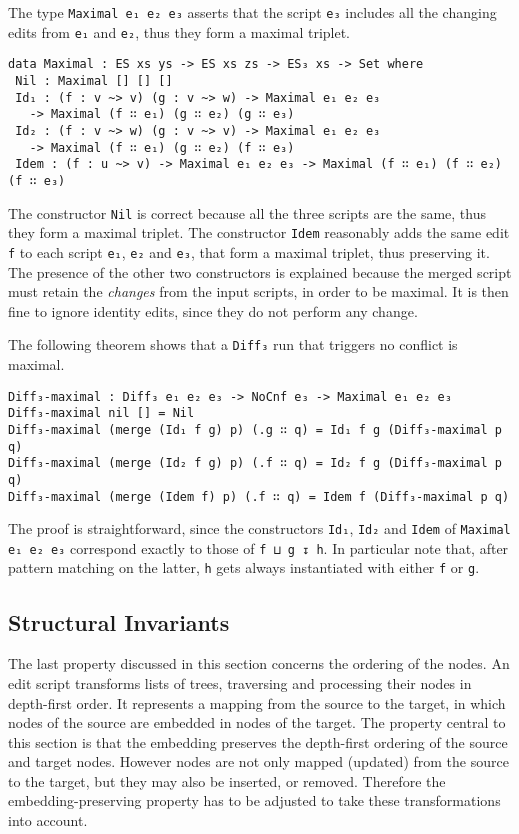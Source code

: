 \documentclass[../Thesis.tex]{subfiles}
\begin{document}
	The type \texttt{Maximal e₁ e₂ e₃} asserts that the script \texttt{e₃} includes
	all the changing edits from \texttt{e₁} and \texttt{e₂}, thus they
	form a maximal triplet.
	
\begin{verbatim}
data Maximal : ES xs ys -> ES xs zs -> ES₃ xs -> Set where
 Nil : Maximal [] [] []
 Id₁ : (f : v ~> v) (g : v ~> w) -> Maximal e₁ e₂ e₃ 
   -> Maximal (f ∷ e₁) (g ∷ e₂) (g ∷ e₃)
 Id₂ : (f : v ~> w) (g : v ~> v) -> Maximal e₁ e₂ e₃ 
   -> Maximal (f ∷ e₁) (g ∷ e₂) (f ∷ e₃)
 Idem : (f : u ~> v) -> Maximal e₁ e₂ e₃ -> Maximal (f ∷ e₁) (f ∷ e₂) (f ∷ e₃)
\end{verbatim}

	The constructor \texttt{Nil} is correct because all the three scripts
	are the same, thus they form a maximal triplet.
	The constructor \texttt{Idem} reasonably adds the same edit \texttt{f} 
	to each script \texttt{e₁}, \texttt{e₂} and \texttt{e₃}, that form a maximal 
	triplet, thus preserving it.
	The presence of the other two constructors is explained because 
	the merged script must retain the \emph{changes} from the 
	input scripts, in order to be maximal.
	It is then fine to ignore identity edits, since they do not perform any 
	change.
	
	The following theorem shows that a \texttt{Diff₃} run that triggers no
	conflict is maximal.
	
\begin{verbatim}
Diff₃-maximal : Diff₃ e₁ e₂ e₃ -> NoCnf e₃ -> Maximal e₁ e₂ e₃
Diff₃-maximal nil [] = Nil
Diff₃-maximal (merge (Id₁ f g) p) (.g ∷ q) = Id₁ f g (Diff₃-maximal p q)
Diff₃-maximal (merge (Id₂ f g) p) (.f ∷ q) = Id₂ f g (Diff₃-maximal p q)
Diff₃-maximal (merge (Idem f) p) (.f ∷ q) = Idem f (Diff₃-maximal p q)
\end{verbatim}
	
	The proof is straightforward, since the constructors \texttt{Id₁}, \texttt{Id₂} 
	and \texttt{Idem} of \texttt{Maximal e₁ e₂ e₃} correspond exactly to those
	of \texttt{f ⊔ g ↧ h}.
	In particular note that, after pattern matching on the latter, \texttt{h} gets
	always instantiated with either \texttt{f} or \texttt{g}.
		
	\subsection{Structural Invariants}
	\label{subsec:Embedding}
	The last property discussed in this section concerns the ordering of 
	the nodes. An edit script transforms lists of trees, traversing and processing 
	their nodes in depth-first order.
	It represents a mapping from the source to the target, in which 
	nodes of the source are embedded in nodes of the target.
	The property central to this section is that the 
	embedding preserves the depth-first ordering of the 
	source and target nodes.
	However nodes are not only mapped (updated) from the source to the 
	target, but they may also be inserted, or removed. 
	Therefore the embedding-preserving property has to be adjusted to
	take these transformations into account.
	
\end{document}
